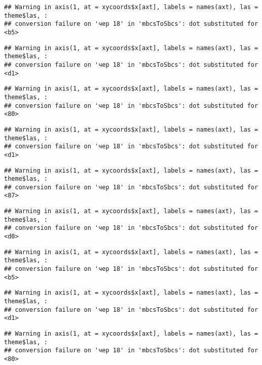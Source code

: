 \documentclass[]{article}
\begin{document}
\begin{verbatim}
## Warning in axis(1, at = xycoords$x[axt], labels = names(axt), las = theme$las, :
## conversion failure on 'чер 18' in 'mbcsToSbcs': dot substituted for <b5>
\end{verbatim}

\begin{verbatim}
## Warning in axis(1, at = xycoords$x[axt], labels = names(axt), las = theme$las, :
## conversion failure on 'чер 18' in 'mbcsToSbcs': dot substituted for <d1>
\end{verbatim}

\begin{verbatim}
## Warning in axis(1, at = xycoords$x[axt], labels = names(axt), las = theme$las, :
## conversion failure on 'чер 18' in 'mbcsToSbcs': dot substituted for <80>
\end{verbatim}

\begin{verbatim}
## Warning in axis(1, at = xycoords$x[axt], labels = names(axt), las = theme$las, :
## conversion failure on 'чер 18' in 'mbcsToSbcs': dot substituted for <d1>
\end{verbatim}

\begin{verbatim}
## Warning in axis(1, at = xycoords$x[axt], labels = names(axt), las = theme$las, :
## conversion failure on 'чер 18' in 'mbcsToSbcs': dot substituted for <87>
\end{verbatim}

\begin{verbatim}
## Warning in axis(1, at = xycoords$x[axt], labels = names(axt), las = theme$las, :
## conversion failure on 'чер 18' in 'mbcsToSbcs': dot substituted for <d0>
\end{verbatim}

\begin{verbatim}
## Warning in axis(1, at = xycoords$x[axt], labels = names(axt), las = theme$las, :
## conversion failure on 'чер 18' in 'mbcsToSbcs': dot substituted for <b5>
\end{verbatim}

\begin{verbatim}
## Warning in axis(1, at = xycoords$x[axt], labels = names(axt), las = theme$las, :
## conversion failure on 'чер 18' in 'mbcsToSbcs': dot substituted for <d1>
\end{verbatim}

\begin{verbatim}
## Warning in axis(1, at = xycoords$x[axt], labels = names(axt), las = theme$las, :
## conversion failure on 'чер 18' in 'mbcsToSbcs': dot substituted for <80>
\end{verbatim}
\end{document}
